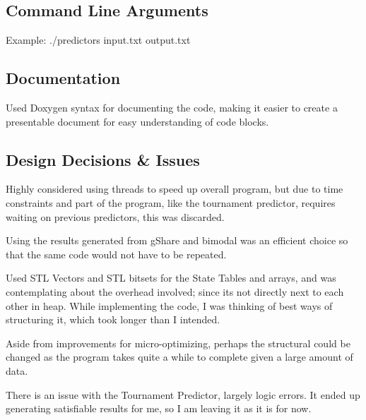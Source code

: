 

 \subsection*{Command Line Arguments }

Example\+: ./predictors input.\+txt output.\+txt 

 \subsection*{Documentation }

Used Doxygen syntax for documenting the code, making it easier to create a presentable document for easy understanding of code blocks. 

 \subsection*{Design Decisions \& Issues }

Highly considered using threads to speed up overall program, but due to time constraints and part of the program, like the tournament predictor, requires waiting on previous predictors, this was discarded.

Using the results generated from g\+Share and bimodal was an efficient choice so that the same code would not have to be repeated.

Used S\+T\+L Vectors and S\+T\+L bitsets for the State Tables and arrays, and was contemplating about the overhead involved; since it\textquotesingle{}s not directly next to each other in heap. While implementing the code, I was thinking of best ways of structuring it, which took longer than I intended.

Aside from improvements for micro-\/optimizing, perhaps the structural could be changed as the program takes quite a while to complete given a large amount of data.

There is an issue with the Tournament Predictor, largely logic errors. It ended up generating satisfiable results for me, so I am leaving it as it is for now. 